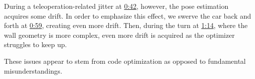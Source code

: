 \documentclass[letta4 paper]{article}
\numberwithin{equation}{section}
\newcommand{\0}{\mathbf{0}}
\begin{document}
During a teleoperation-related jitter at \href{https://youtu.be/OCojTZnd3rk?t=42}{0:42}, however, the pose estimation acquires some drift. In order to emphasize this effect, we swerve the car back and forth at \href{https://youtu.be/OCojTZnd3rk?t=59}{0:59}, creating even more drift. Then, during the turn at \href{https://youtu.be/OCojTZnd3rk?t=74}{1:14}, where the wall geometry is more complex, even more drift is acquired as the optimizer struggles to keep up.

These issues appear to stem from code optimization as opposed to fundamental misunderstandings.
\end{document}
